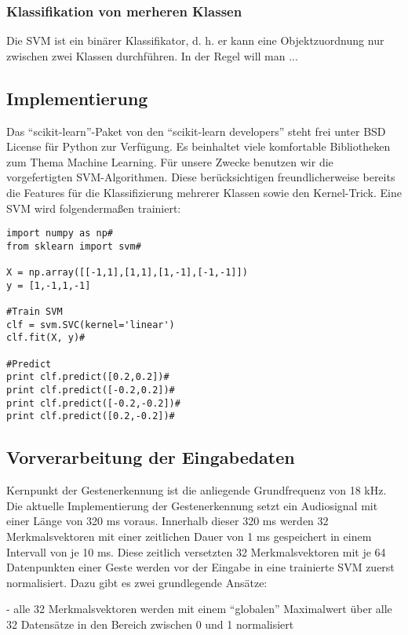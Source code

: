 \subsubsection{Klassifikation von merheren Klassen}

Die SVM ist ein binärer Klassifikator, d. h. er kann eine Objektzuordnung nur zwischen zwei Klassen durchführen. 
In der Regel will man ...


\newpage

\subsection{Implementierung}

Das “scikit-learn”-Paket von den “scikit-learn developers” steht frei unter BSD License für Python zur Verfügung. 
Es beinhaltet viele komfortable Bibliotheken zum Thema Machine Learning. 
Für unsere Zwecke benutzen wir die vorgefertigten SVM-Algorithmen. 
Diese berücksichtigen freundlicherweise bereits die Features für die Klassifizierung mehrerer Klassen sowie den Kernel-Trick. Eine SVM wird folgendermaßen trainiert:

\begin{lstlisting}
import numpy as np#
from sklearn import svm#

X = np.array([[-1,1],[1,1],[1,-1],[-1,-1]])
y = [1,-1,1,-1]

#Train SVM
clf = svm.SVC(kernel='linear')
clf.fit(X, y)#

#Predict
print clf.predict([0.2,0.2])#
print clf.predict([-0.2,0.2])#
print clf.predict([-0.2,-0.2])#
print clf.predict([0.2,-0.2])#
\end{lstlisting}


\subsection{Vorverarbeitung der Eingabedaten}

Kernpunkt der Gestenerkennung ist die anliegende Grundfrequenz von 18 kHz. 
Die aktuelle Implementierung der Gestenerkennung setzt ein Audiosignal mit einer Länge von 320 ms voraus. 
Innerhalb dieser 320 ms werden 32 Merkmalsvektoren mit einer zeitlichen Dauer von 1 ms gespeichert in einem Intervall von je 10 ms. 
Diese zeitlich versetzten 32 Merkmalsvektoren mit je 64 Datenpunkten einer Geste werden vor der Eingabe in eine trainierte SVM zuerst normalisiert. 
Dazu gibt es zwei grundlegende Ansätze:

- alle 32 Merkmalsvektoren werden mit einem “globalen” Maximalwert über alle 32 Datensätze in den Bereich zwischen 0 und 1 normalisiert\newline

